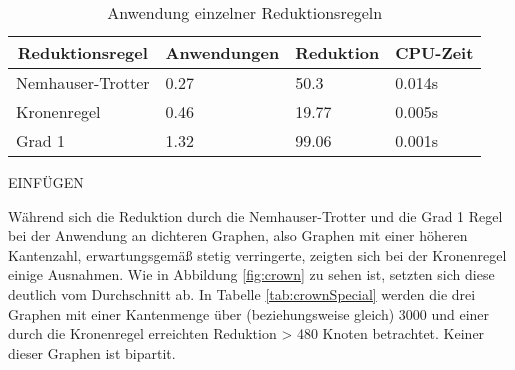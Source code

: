 \begin{table}[htb]
\caption{Anwendung einzelner Reduktionsregeln\label{tab:anwendung}}
\vspace*{1em}
\centering

\bgroup
\def\arraystretch{1.3}%

\begin{threeparttable}

\begin{tabular}[c]{l|l|l|l}
	
	\multicolumn{1}{c|}{\textbf{Reduktionsregel}} & 
	\multicolumn{1}{c|}{\textbf{Anwendungen}} & 
	\multicolumn{1}{c|}{\textbf{Reduktion}} & 
	\multicolumn{1}{c}{\textbf{CPU-Zeit }} \\ 
	
	\hline

	Nemhauser-Trotter& 0.27 &  50.3 & 0.014s\\
	Kronenregel& 0.46 & 19.77 & 0.005s\\
	Grad 1&1.32 & 99.06 & 0.001s\\
	
\end{tabular}

\begin{tablenotes}\footnotesize
\item EINFÜGEN
\end{tablenotes}

\end{threeparttable}

\egroup

\end{table}
Während sich die Reduktion durch die Nemhauser-Trotter und die Grad 1 Regel bei der Anwendung an dichteren Graphen, also Graphen mit einer höheren Kantenzahl, erwartungsgemäß stetig verringerte, zeigten sich bei der Kronenregel einige Ausnahmen. Wie in Abbildung \ref{fig:crown} zu sehen ist, setzten sich diese deutlich vom Durchschnitt ab. In Tabelle \ref{tab:crownSpecial} werden die drei Graphen mit einer Kantenmenge über (beziehungsweise gleich) 3000 und einer durch die Kronenregel erreichten Reduktion > 480 Knoten betrachtet. Keiner dieser Graphen ist bipartit.
